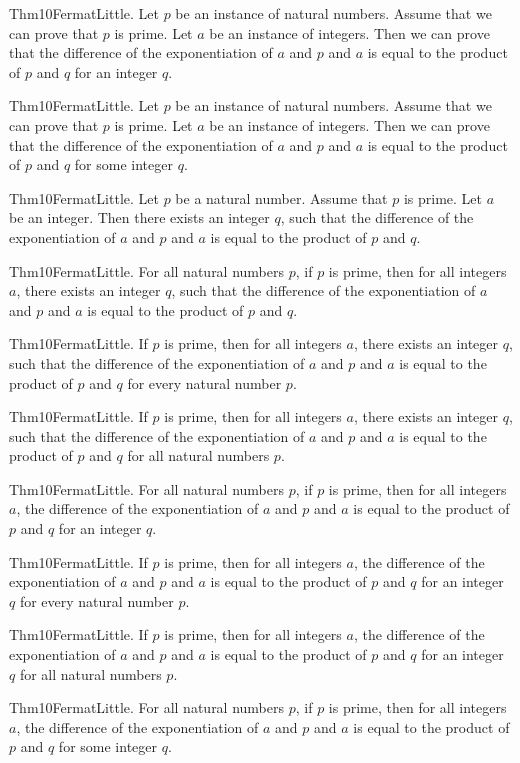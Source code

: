 \documentclass{article}
\begin{document}
Thm10FermatLittle. Let $p$ be an instance of natural numbers. Assume that we can prove that $p$ is prime. Let $a$ be an instance of integers. Then we can prove that the difference of the exponentiation of $a$ and $p$ and $a$ is equal to the product of $p$ and $q$ for an integer $q$.

Thm10FermatLittle. Let $p$ be an instance of natural numbers. Assume that we can prove that $p$ is prime. Let $a$ be an instance of integers. Then we can prove that the difference of the exponentiation of $a$ and $p$ and $a$ is equal to the product of $p$ and $q$ for some integer $q$.

Thm10FermatLittle. Let $p$ be a natural number. Assume that $p$ is prime. Let $a$ be an integer. Then there exists an integer $q$, such that the difference of the exponentiation of $a$ and $p$ and $a$ is equal to the product of $p$ and $q$.

Thm10FermatLittle. For all natural numbers $p$, if $p$ is prime, then for all integers $a$, there exists an integer $q$, such that the difference of the exponentiation of $a$ and $p$ and $a$ is equal to the product of $p$ and $q$.

Thm10FermatLittle. If $p$ is prime, then for all integers $a$, there exists an integer $q$, such that the difference of the exponentiation of $a$ and $p$ and $a$ is equal to the product of $p$ and $q$ for every natural number $p$.

Thm10FermatLittle. If $p$ is prime, then for all integers $a$, there exists an integer $q$, such that the difference of the exponentiation of $a$ and $p$ and $a$ is equal to the product of $p$ and $q$ for all natural numbers $p$.

Thm10FermatLittle. For all natural numbers $p$, if $p$ is prime, then for all integers $a$, the difference of the exponentiation of $a$ and $p$ and $a$ is equal to the product of $p$ and $q$ for an integer $q$.

Thm10FermatLittle. If $p$ is prime, then for all integers $a$, the difference of the exponentiation of $a$ and $p$ and $a$ is equal to the product of $p$ and $q$ for an integer $q$ for every natural number $p$.

Thm10FermatLittle. If $p$ is prime, then for all integers $a$, the difference of the exponentiation of $a$ and $p$ and $a$ is equal to the product of $p$ and $q$ for an integer $q$ for all natural numbers $p$.

Thm10FermatLittle. For all natural numbers $p$, if $p$ is prime, then for all integers $a$, the difference of the exponentiation of $a$ and $p$ and $a$ is equal to the product of $p$ and $q$ for some integer $q$.
\end{document}
